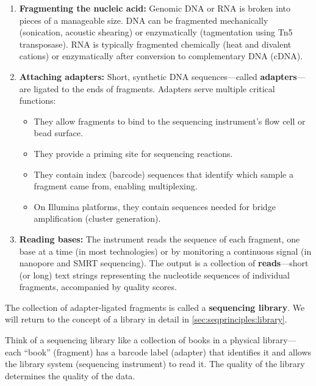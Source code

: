 \begin{enumerate}[itemsep=3pt]
  \item \textbf{Fragmenting the nucleic acid:} Genomic DNA or RNA is broken into pieces of a manageable size. DNA can be fragmented mechanically (sonication, acoustic shearing) or enzymatically (tagmentation using Tn5 transposase). RNA is typically fragmented chemically (heat and divalent cations) or enzymatically after conversion to complementary DNA (cDNA).

  \item \textbf{Attaching adapters:} Short, synthetic DNA sequences---called \textbf{adapters}---are ligated to the ends of fragments. Adapters serve multiple critical functions:
  \begin{itemize}[itemsep=1pt]
    \item They allow fragments to bind to the sequencing instrument's flow cell or bead surface.
    \item They provide a priming site for sequencing reactions.
    \item They contain index (barcode) sequences that identify which sample a fragment came from, enabling multiplexing.
    \item On Illumina platforms, they contain sequences needed for bridge amplification (cluster generation).
  \end{itemize}

  \item \textbf{Reading bases:} The instrument reads the sequence of each fragment, one base at a time (in most technologies) or by monitoring a continuous signal (in nanopore and SMRT sequencing). The output is a collection of \textbf{reads}---short (or long) text strings representing the nucleotide sequences of individual fragments, accompanied by quality scores.
\end{enumerate}

The collection of adapter-ligated fragments is called a \textbf{sequencing library}. We will return to the concept of a library in detail in \cref{sec:seqprinciples:library}.

\begin{tipbox}
Think of a sequencing library like a collection of books in a physical library---each ``book'' (fragment) has a barcode label (adapter) that identifies it and allows the library system (sequencing instrument) to read it. The quality of the library determines the quality of the data.
\end{tipbox}


